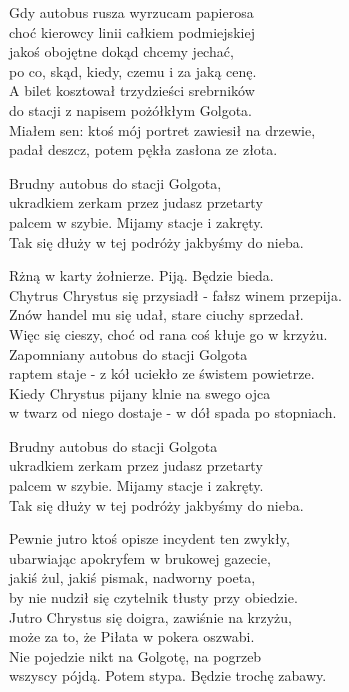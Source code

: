 \begin{text}
    \hfill\break
    Gdy autobus rusza wyrzucam papierosa\\
    choć kierowcy linii całkiem podmiejskiej\\
    jakoś obojętne dokąd chcemy jechać,\\
    po co, skąd, kiedy, czemu i za jaką cenę.\\
    A bilet kosztował trzydzieści srebrników\\
    do stacji z napisem pożółkłym Golgota.\\
    Miałem sen: ktoś mój portret zawiesił na drzewie,\\
    padał deszcz, potem pękła zasłona ze złota.

    Brudny autobus do stacji Golgota,\\
    ukradkiem zerkam przez judasz przetarty\\
    palcem w szybie. Mijamy stacje i zakręty.\\
    Tak się dłuży w tej podróży jakbyśmy do nieba.

    Rżną w karty żołnierze. Piją. Będzie bieda.\\
    Chytrus Chrystus się przysiadł - fałsz winem przepija.\\
    Znów handel mu się udał, stare ciuchy sprzedał.\\
    Więc się cieszy, choć od rana coś kłuje go w krzyżu.\\
    Zapomniany autobus do stacji Golgota\\
    raptem staje - z kół uciekło ze świstem powietrze.\\
    Kiedy Chrystus pijany klnie na swego ojca\\
    w twarz od niego dostaje - w dół spada po stopniach.

    Brudny autobus do stacji Golgota\\
    ukradkiem zerkam przez judasz przetarty\\
    palcem w szybie. Mijamy stacje i zakręty.\\
    Tak się dłuży w tej podróży jakbyśmy do nieba.

    Pewnie jutro ktoś opisze incydent ten zwykły,\\
    ubarwiając apokryfem w brukowej gazecie,\\
    jakiś żul, jakiś pismak, nadworny poeta,\\
    by nie nudził się czytelnik tłusty przy obiedzie.\\
    Jutro Chrystus się doigra, zawiśnie na krzyżu,\\
    może za to, że Piłata w pokera oszwabi.\\
    Nie pojedzie nikt na Golgotę, na pogrzeb\\
    wszyscy pójdą. Potem stypa. Będzie trochę zabawy.


\end{text}
